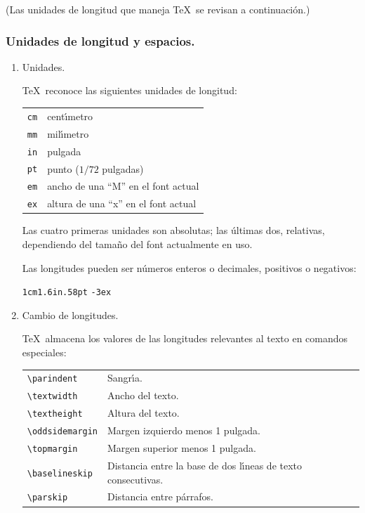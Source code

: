 {(Las unidades de
longitud que maneja \TeX\ se revisan  a continuaci\'on.)

\subsubsection{Unidades de longitud y espacios.}
\label{unidades}

\begin{enumerate}
\item[a)] Unidades.

\TeX\ reconoce las siguientes unidades de longitud:

\vspace{.3cm}
\begin{tabular}{ll}
\verb+cm+ & cent\'{\i}metro\\
\verb+mm+ & mil\'{\i}metro\\
\verb+in+ & pulgada\\
\verb+pt+ & punto ($1/72$ pulgadas)\\
\verb+em+ & ancho de una ``M'' en el font actual\\
\verb+ex+ & altura de una ``x'' en el font actual
\end{tabular}
\vspace{.3cm}

Las cuatro primeras unidades son absolutas; las {\'u}ltimas dos,
relativas, dependiendo del tama{\~n}o del font actualmente en uso. 

Las longitudes pueden ser n{\'u}meros enteros o decimales, positivos o
negativos: 

\begin{center}
\verb+1cm+\hspace{1cm}\verb+1.6in+\hspace{1cm}\verb+.58pt+
\hspace{1cm}\verb+-3ex+
\end{center}

\item[b)] Cambio de longitudes.

\TeX\ almacena los valores de las longitudes relevantes al texto en
comandos especiales:

\vspace{.3cm}
\begin{tabular}{lp{7.5cm}}
\verb+\parindent+ & Sangr\'{\i}a.\\[.3cm]
\verb+\textwidth+ & Ancho del texto.\\[.3cm]
\verb+\textheight+ & Altura del texto.\\[.3cm]
\verb+\oddsidemargin+ & Margen izquierdo menos 1 pulgada. \\[.3cm]
\verb+\topmargin+ & Margen superior menos 1 pulgada. \\[.3cm]
\verb+\baselineskip+ & Distancia entre la base de dos l\'{\i}neas de
texto consecutivas. \\[.3cm]
\verb+\parskip+ & Distancia entre p{\'a}rrafos. 
\end{tabular}
\vspace{.3cm}


\end{enumerate}}

